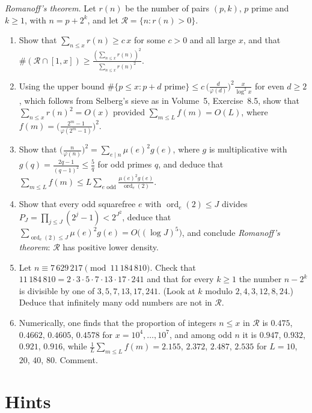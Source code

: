 \begin{exercise}[Journey]\label{pb:romanoff}
\emph{Romanoff's theorem.} Let $r(n)$ be the number of pairs $(p,k)$, $p$ prime and $k\ge1$, with $n=p+2^k$, and let $\mathcal R=\{n:r(n)>0\}$.
\begin{enumerate}[label=(\alph*)]
\item Show that $\sum_{n\le x}r(n)\ge c\,x$ for some $c>0$ and all large $x$, and that $\#(\mathcal R\cap[1,x])\ge\frac{(\sum_{n\le x}r(n))^2}{\sum_{n\le x}r(n)^2}$.
\item Using the upper bound $\#\{p\le x:p+d\text{ prime}\}\le c\,\bigl(\frac d{\varphi(d)}\bigr)^2\frac x{\log^2x}$ for even $d\ge2$, which follows from Selberg's sieve as in
Volume~5, Exercise~8.5, show that $\sum_{n\le x}r(n)^2=O(x)$ provided $\sum_{m\le L}f(m)=O(L)$, where $f(m)=\bigl(\frac{2^m-1}{\varphi(2^m-1)}\bigr)^2$.
\item Show that $\bigl(\frac n{\varphi(n)}\bigr)^2=\sum_{e\mid n}\mu(e)^2g(e)$, where $g$ is multiplicative with $g(q)=\frac{2q-1}{(q-1)^2}\le\frac5q$ for odd primes $q$, and
deduce that $\sum_{m\le L}f(m)\le L\sum_{e\text{ odd}}\frac{\mu(e)^2g(e)}{\operatorname{ord}_e(2)}$.
\item Show that every odd squarefree $e$ with $\operatorname{ord}_e(2)\le J$ divides $P_J=\prod_{j\le J}(2^j-1)<2^{J^2}$, deduce that
$\sum_{\operatorname{ord}_e(2)\le J}\mu(e)^2g(e)=O\bigl((\log J)^5\bigr)$, and conclude \emph{Romanoff's theorem}: $\mathcal R$ has positive lower density.
\item Let $n\equiv7\,629\,217\pmod{11\,184\,810}$. Check that $11\,184\,810=2\cdot3\cdot5\cdot7\cdot13\cdot17\cdot241$ and that for every $k\ge1$ the number $n-2^k$ is
divisible by one of $3,5,7,13,17,241$. (Look at $k$ modulo $2,4,3,12,8,24$.) Deduce that infinitely many odd numbers are not in $\mathcal R$.
\item Numerically, one finds that the proportion of integers $n\le x$ in $\mathcal R$ is $0.475$, $0.4662$, $0.4605$, $0.4578$ for $x=10^4,\dots,10^7$, and among odd $n$
it is $0.947$, $0.932$, $0.921$, $0.916$, while $\frac1L\sum_{m\le L}f(m)=2.155$, $2.372$, $2.487$, $2.535$ for $L=10$, $20$, $40$, $80$. Comment.
\end{enumerate}
\end{exercise}

\section{Hints}

